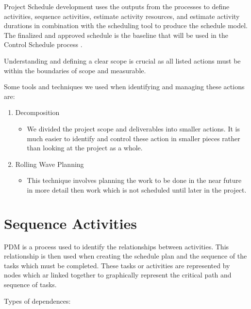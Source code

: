 Project Schedule development uses the outputs from the processes to define activities, sequence activities, estimate activity resources, and estimate activity durations in combination with the scheduling tool to produce the schedule model. The finalized and approved schedule is the baseline that will be used in the Control Schedule process \parencite{pmbok}.

Understanding and defining a clear scope is crucial as all listed actions must be within the boundaries of scope and measurable.

Some tools and techniques we used when identifying and managing these actions are:

\begin{enumerate}
\item Decomposition
\begin{itemize}
\item We divided the project scope and deliverables into smaller actions. It is much easier to identify and control these action in smaller pieces rather than looking at the project as a whole.
\end{itemize}
\item Rolling Wave Planning
\begin{itemize}
\item This technique involves planning the work to be done in the near future in more detail then work which is not scheduled until later in the project.
\end{itemize}
\end{enumerate}

\section{Sequence Activities}

PDM is a process used to identify the relationships between activities. This relationship is then used when creating the schedule plan and the sequence of the tasks which must be completed. These tasks or activities are represented by nodes which ar linked together to graphically represent the critical path and sequence of tasks.

Types of dependences:

